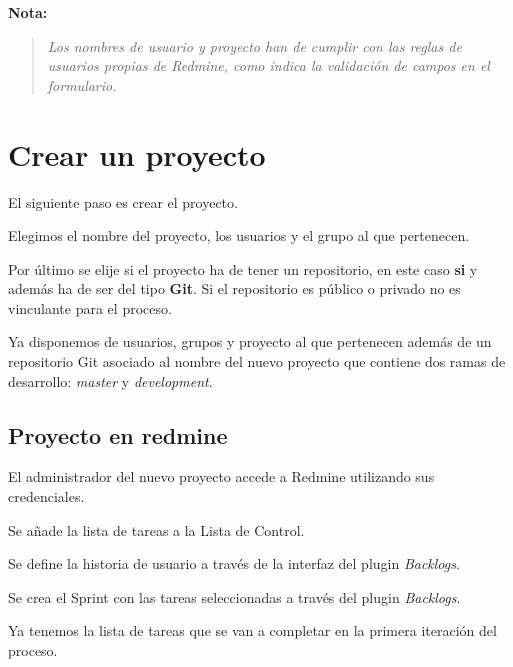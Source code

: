 \par \textbf{Nota:}

\begin{quote}
    \emph{Los nombres de usuario y proyecto han de cumplir con las reglas de usuarios propias de Redmine, como indica la validación de campos en el formulario.}
\end{quote}


\section{Crear un proyecto}
\label{sec:crear-proyecto}

\par El siguiente paso es crear el proyecto.

\par Elegimos el nombre del proyecto, los usuarios y el grupo al que pertenecen.

\par Por último se elije si el proyecto ha de tener un repositorio, en este caso \textbf{si} y además ha de ser del tipo \textbf{Git}. Si el repositorio es público o privado no es vinculante para el proceso.

\par Ya disponemos de usuarios, grupos y proyecto al que pertenecen además de un repositorio Git asociado al nombre del nuevo proyecto que contiene dos ramas de desarrollo: \emph{master} y \emph{development}.

\subsection{Proyecto en redmine}
\label{sub:proyeto-redmine}

\par El administrador del nuevo proyecto accede a Redmine utilizando sus credenciales.

\par Se añade la lista de tareas a la Lista de Control.

\par Se define la historia de usuario a través de la interfaz del plugin \emph{Backlogs}.

\par Se crea el Sprint con las tareas seleccionadas a través del plugin \emph{Backlogs}.

\par Ya tenemos la lista de tareas que se van a completar en la primera iteración del proceso.

